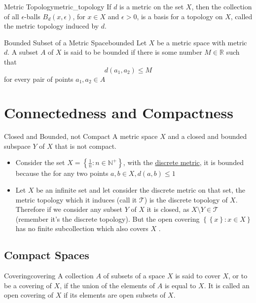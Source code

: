 \begin{definition}{Metric Topology}{metric_topology}
If $d$ is a metric on the set $X$, then the collection of all $\epsilon$-balls $B_{d}(x, \epsilon)$, for $x \in X$ and $\epsilon>0$, is a basis for a topology on $X$, called the metric topology induced by $d$.
\end{definition}


\begin{definition}{Bounded Subset of a Metric Space}{bounded}
Let $X$ be a metric space with metric $d$. A subset $A$ of $X$ is said to be bounded if there is some number $M \in  \mathbb{R}$ such that
$$
d\left(a_{1}, a_{2}\right) \leq M
$$
for every pair of points $ a_{ 1 } , a_{ 2 } \in  A $ 
\end{definition}


\section{Connectedness and Compactness}

\begin{example}{Closed and Bounded, not Compact}{}
A metric space $X$  and a closed and bounded subspace $Y$ of  $X$  that is not compact.
\end{example}

\begin{itemize}
    \item Consider the set $ X =  \left\{ \frac{1}{n}: n \in  \mathbb{N} ^{ +  }  \right\}  $, with the \hyperref[example:discrete_metric]{discrete metric}, it is bounded because the for any two points $ a, b \in X, d\left( a, b \right)  \le 1 $  
    \item Let $ X $ be an infinite set and let consider the discrete metric on that set,  the metric topology which it induces (call it $ \mathcal{ T }  $)  is the discrete topology of $ X $. Therefore if we consider any subset $ Y $ of $ X $ it is closed, as $ X \setminus Y \in  \mathcal{ T }  $ (remember it's the discrete topology). But the open covering $ \left\{ \left\{ x \right\} : x \in  X \right\}  $ has no finite subcollection which also covers $ X $ .
\end{itemize}


\subsection{Compact Spaces}

\begin{definition}{Covering}{covering}
A collection $A$ of subsets of a space $X$ is said to cover $X$, or to be a covering of $X$, if the union of the elements of $A$ is equal to $X$. It is called an open covering of $X$ if its elements are open subsets of $X$.
\end{definition}


